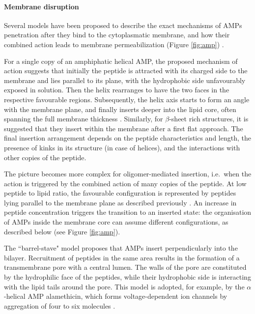 \paragraph{Membrane disruption} Several models have been proposed to describe the exact mechanisms of AMPs penetration after they bind to the cytoplasmatic membrane, and how their combined action leads to membrane permeabilization (Figure \ref{fig:amp}) \citep{Brogden2005,Nguyen2011}.

For a single copy of an amphiphatic helical AMP, the proposed mechanism of action suggests that initially the peptide is attracted with its charged side to the membrane and lies parallel to its plane, with the hydrophobic side unfavourably exposed in solution. Then the helix rearranges to have the two faces in the respective favourable regions. Subsequently, the helix axis starts to form an angle with the membrane plane, and finally inserts deeper into the lipid core, often spanning the full membrane thickness \citep{Ebenhan2014}.
%
Similarly, for $\beta$-sheet rich structures, it is suggested that they insert within the membrane after a first flat approach.
%
The final insertion arrangement depends on the peptide characteristics and length, the presence of kinks in its structure (in case of helices), and the interactions with other copies of the peptide.

The picture becomes more complex for oligomer-mediated insertion, i.e.\ when the action is triggered by the combined action of many copies of the peptide.
%
At low peptide to lipid ratio, the favourable configuration is represented by peptides lying parallel to the membrane plane as described previously \citep{Yang2001}. An increase in peptide concentration triggers the transition to an inserted state: the organisation of AMPs inside the membrane core can assume different configurations, as described below \citep{Brogden2005,Nguyen2011,Ebenhan2014,Mahlapuu2016} (see Figure \ref{fig:amp}).

The ``barrel-stave" model proposes that AMPs insert perpendicularly into the bilayer.
Recruitment of peptides in the same area results in the formation of a transmembrane pore with a central lumen. The walls of the pore are constituted by the hydrophilic face of the peptides, while their hydrophobic side is interacting with the lipid tails around the pore. This model is adopted, for example, by the $\alpha$-helical AMP alamethicin, which forms voltage-dependent ion channels by aggregation of four to six molecules \citep{Spaar2004}.

